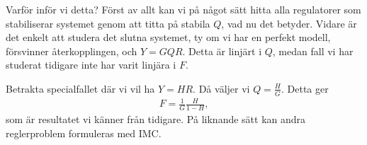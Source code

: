 Varför inför vi detta? Först av allt kan vi på något sätt hitta alla regulatorer som stabiliserar systemet genom att titta på stabila $Q$, vad nu det betyder. Vidare är det enkelt att studera det slutna systemet, ty om vi har en perfekt modell, försvinner återkopplingen, och $Y = GQR$. Detta är linjärt i $Q$, medan fall vi har studerat tidigare inte har varit linjära i $F$.

Betrakta specialfallet där vi vil ha $Y = HR$. Då väljer vi $Q = \frac{H}{G}$. Detta ger
\begin{align*}
	F = \frac{1}{G}\frac{H}{1 - H},
\end{align*}
som är resultatet vi känner från tidigare. På liknande sätt kan andra reglerproblem formuleras med IMC.